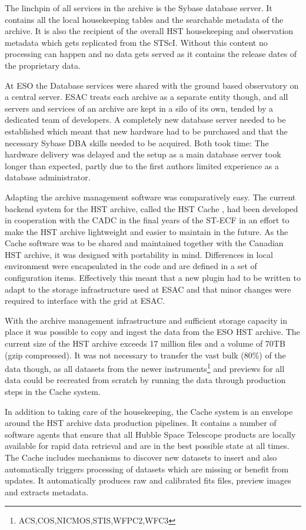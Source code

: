 The linchpin of all services in the archive is the Sybase database server. It contains all the local housekeeping tables and the searchable metadata of the archive. It is also the recipient of the overall HST housekeeping  and observation metadata which gets replicated from the STScI. Without this content no processing can happen and no data gets served as it contains the release dates of the proprietary data.
  
At ESO the Database services were shared with the ground based observatory on a central server. ESAC treats each archive as a separate entity though, and all servers and services of an archive are kept in a silo of its own, tended by a dedicated team of developers. A completely new database server needed to be established which meant that new hardware had to be purchased and that the necessary Sybase DBA skills needed to be acquired. Both took time: The hardware delivery was delayed and the setup as a main database server took longer than expected, partly due to the first authors limited experience as a database administrator.

Adapting the archive management software was comparatively easy. The current backend system for the HST archive, called the HST Cache \citep{2010ASPC..434..275H},  had been developed in cooperation with the CADC in the final years of the ST-ECF in an effort to make the HST archive lightweight and easier to maintain in the future. As the Cache software was to be shared and maintained together with the Canadian HST archive, it was designed with portability in mind. Differences in local environment were encapsulated in the code and are defined in a set of configuration items. Effectively this meant that a new plugin had to be written to adapt to the storage infrastructure used at ESAC and that minor changes were required to interface with the grid at ESAC. 


With the archive management infrastructure and sufficient storage capacity in place it was possible to copy and ingest the data from the ESO HST archive. The current size of the HST archive exceeds 17 million files and a volume of 70TB (gzip compressed). It was not necessary to transfer the vast bulk (80\%) of the data though, as all datasets from the newer instruments\footnote{ACS,COS,NICMOS,STIS,WFPC2,WFC3} and previews for all data could be recreated from scratch by running the data through production steps in the Cache system. 

In addition to taking care of the housekeeping, the Cache system is an envelope around the HST archive data production pipelines. It contains a number of software agents that ensure that all Hubble Space Telescope products are locally available for rapid data retrieval and are in the best possible state at all times.  The Cache includes mechanisms to discover new datasets to insert and also automatically triggers processing of datasets which are missing or benefit from updates. It automatically produces raw and calibrated fits files, preview images and extracts metadata.

